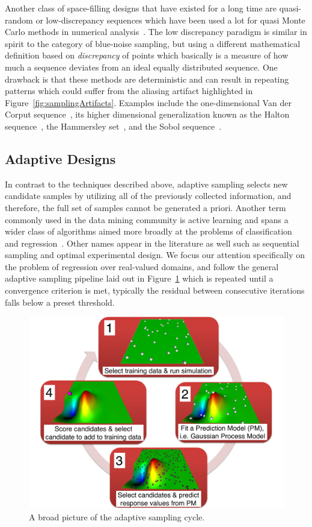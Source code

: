 Another class of space-filling designs that have existed for a long time are quasi-random or low-discrepancy sequences which have been used a lot for quasi Monte Carlo methods in numerical analysis~\cite{Niederreiter1992}.
%
The low discrepancy paradigm is similar in spirit to the category of blue-noise sampling, but using a different mathematical definition based on \textit{discrepancy} of points which basically is a measure of how much a sequence deviates from an ideal equally distributed sequence.
%
One drawback is that these methods are deterministic and can result in repeating patterns which could suffer from the aliasing artifact highlighted in Figure~\ref{fig:samplingArtifacts}.
%
Examples include the one-dimensional Van der Corput sequence~\cite{vanderCorput1935}, its higher dimensional generalization known as the Halton sequence~\cite{Halton1964,BraatenWeller1979}, the Hammersley set~\cite{HammersleyHandscomb1964}, and the Sobol sequence~\cite{Sobol1967}.

\subsection{Adaptive Designs}
\label{sec:adaptiveSampling}

In contrast to the techniques described above, adaptive sampling selects new candidate samples by utilizing all of the previously collected information, and therefore, the full set of samples cannot be generated a priori.
%
Another term commonly used in the data mining community is active learning and spans a wider class of algorithms aimed more broadly at the problems of classification and regression~\cite{Settles2009}.
%
Other names appear in the literature as well such as sequential sampling and optimal experimental design.
%
We focus our attention specifically on the problem of regression over real-valued domains, and follow the general adaptive sampling pipeline laid out in Figure~\ref{fig:asCycle} which is repeated until a convergence criterion is met, typically the residual between consecutive iterations falls below a preset threshold.

\begin{figure}[t]
  \centering
  \includegraphics[width=.75\textwidth]{figs/chap3/pipeline}
  \caption[Adaptive Sampling Cycle]{A broad picture of the adaptive sampling
  cycle.}
  \label{fig:asCycle}
\end{figure}

